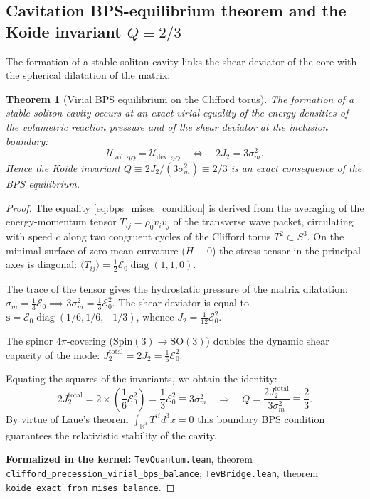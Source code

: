 \documentclass[11pt,a4paper]{article}
\newtheorem{theorem}{Theorem}
\theoremstyle{definition}
\theoremstyle{remark}
\begin{document}
\subsection{Cavitation BPS-equilibrium theorem and the Koide invariant $Q \equiv 2/3$}

The formation of a stable soliton cavity links the shear deviator of the core with the spherical dilatation of the matrix:

\begin{theorem}[Virial BPS equilibrium on the Clifford torus]
\label{thm:bps_cavitation}
The formation of a stable soliton cavity occurs at an exact virial equality of the energy densities of the volumetric reaction pressure and of the shear deviator at the inclusion boundary:
\begin{equation}
    \mathcal{U}_{\mathrm{vol}} \big|_{\partial\Omega} = \mathcal{U}_{\mathrm{dev}} \big|_{\partial\Omega} \quad \Longleftrightarrow \quad 2 J_2 = 3 \sigma_m^2.
    \label{eq:bps_mises_condition}
\end{equation}
Hence the Koide invariant $Q \equiv 2J_2 / (3\sigma_m^2) \equiv 2/3$ is an exact consequence of the BPS equilibrium.
\end{theorem}
\begin{proof}
The equality \eqref{eq:bps_mises_condition} is derived from the averaging of the energy-momentum tensor $T_{ij} = \rho_0 v_i v_j$ of the transverse wave packet, circulating with speed $c$ along two congruent cycles of the Clifford torus $T^2 \subset S^3$. On the minimal surface of zero mean curvature ($H \equiv 0$) the stress tensor in the principal axes is diagonal: $\langle T_{ij} \rangle = \frac{1}{2}\mathcal{E}_0 \operatorname{diag}(1, 1, 0)$.

The trace of the tensor gives the hydrostatic pressure of the matrix dilatation: $\sigma_m = \frac{1}{3}\mathcal{E}_0 \implies 3\sigma_m^2 = \frac{1}{3}\mathcal{E}_0^2$. The shear deviator is equal to $\mathbf{s} = \mathcal{E}_0 \operatorname{diag}(1/6, 1/6, -1/3)$, whence $J_2 = \frac{1}{12}\mathcal{E}_0^2$. 

The spinor $4\pi$-covering ($\mathrm{Spin}(3) \to \mathrm{SO}(3)$) doubles the dynamic shear capacity of the mode: $J_2^{\mathrm{total}} = 2 J_2 = \frac{1}{6}\mathcal{E}_0^2$. 

Equating the squares of the invariants, we obtain the identity:
\begin{equation}
2 J_2^{\mathrm{total}} = 2 \times \left(\frac{1}{6}\mathcal{E}_0^2\right) = \frac{1}{3}\mathcal{E}_0^2 \equiv 3\sigma_m^2 \quad \Longrightarrow \quad Q = \frac{2 J_2^{\mathrm{total}}}{3\sigma_m^2} \equiv \frac{2}{3}.
\end{equation}
By virtue of Laue's theorem $\int_{\mathbb{R}^3} T^{ii} d^3x = 0$ this boundary BPS condition guarantees the relativistic stability of the cavity.

\noindent\small\textbf{Formalized in the kernel:} \texttt{TevQuantum.lean}, theorem \texttt{clifford_precession_virial_bps_balance}; \texttt{TevBridge.lean}, theorem \texttt{koide_exact_from_mises_balance}.
\end{proof}
\end{document}
